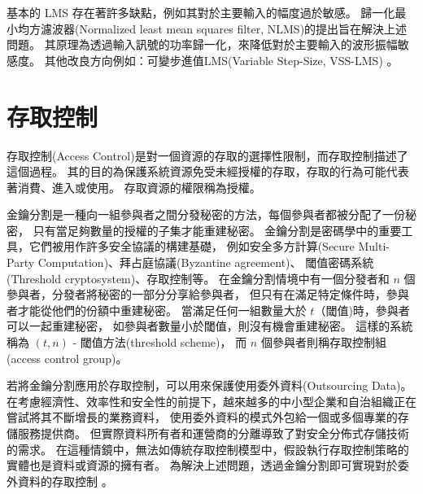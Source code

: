     基本的 LMS 存在著許多缺點，例如其對於主要輸入的幅度過於敏感。
歸一化最小均方濾波器(Normalized least mean squares filter, NLMS)的提出旨在解決上述問題。
其原理為透過輸入訊號的功率歸一化，來降低對於主要輸入的波形振幅敏感度\cite{book198585}。
其他改良方向例如：可變步進值LMS(Variable Step-Size, VSS-LMS) \cite{kwong1992variable}。


\section{存取控制}\label{section:background-access-control}

    存取控制(Access Control)是對一個資源的存取的選擇性限制\cite{rfc4949}，而存取控制描述了這個過程。
其的目的為保護系統資源免受未經授權的存取，存取的行為可能代表著消費、進入或使用。
存取資源的權限稱為授權\cite{sandhu1994access}。

    金鑰分割是一種向一組參與者之間分發秘密的方法，每個參與者都被分配了一份秘密，
只有當足夠數量的授權的子集才能重建秘密。
金鑰分割是密碼學中的重要工具，它們被用作許多安全協議的構建基礎，
例如安全多方計算(Secure Multi-Party Computation)、拜占庭協議(Byzantine agreement)、
閾值密碼系統(Threshold cryptosystem)、存取控制等\cite{beimel2011secret}。
在金鑰分割情境中有一個分發者和 $n$ 個參與者，分發者將秘密的一部分分享給參與者，
但只有在滿足特定條件時，參與者才能從他們的份額中重建秘密。
當滿足任何一組數量大於 $t$（閾值)時，參與者可以一起重建秘密，
如參與者數量小於閾值，則沒有機會重建秘密。
這樣的系統稱為 $(t , n )$ - 閾值方法(threshold scheme)，
而 $n$ 個參與者則稱存取控制組(access control group)\cite{chum2012proposed}。

    若將金鑰分割應用於存取控制，可以用來保護使用委外資料(Outsourcing Data)。
在考慮經濟性、效率性和安全性的前提下，越來越多的中小型企業和自治組織正在嘗試將其不斷增長的業務資料，
使用委外資料的模式外包給一個或多個專業的存儲服務提供商。
但實際資料所有者和運營商的分離導致了對安全分佈式存儲技術的需求。
在這種情鏡中，無法如傳統存取控制模型中，假設執行存取控制策略的實體也是資料或資源的擁有者。
為解決上述問題，透過金鑰分割即可實現對於委外資料的存取控制
\cite{naor1998access}\cite{hadavi2016access}\cite{zhang2016privacy}。